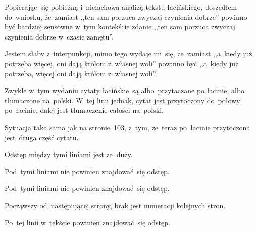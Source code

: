 \documentclass[a4paper,11pt]{article}
\begin{document}
\vspace{\spaceFour}


\start {} Popierając~się pobieżną i~niefachową analizą
tekstu łacińskiego, doszedłem do~wniosku, że~zamiast ,,ten sam porzuca
zwyczaj czynienia dobrze'' powinno być bardziej sensowne w~tym
kontekście zdanie ,,ten sam porzuca zwyczaj czynienia dobrze w~czasie
zamętu''.

\vspace{\spaceFour}


\start {} Jestem słaby z~interpunkcji, mimo tego wydaje
mi~się, że~zamiast ,,a~kiedy już potrzeba więcej, oni dają królom
z~własnej woli'' powinno być ,,a~kiedy już potrzeba, więcej oni dają
królom z~własnej woli''.

\vspace{\spaceFour}


\start {} Zwykle w~tym wydaniu cytaty łacińskie~są
albo~przytaczane po łacinie, albo tłumaczone na~polski. W~tej linii
jednak, cytat jest przytoczony do~połowy po~łacinie, dalej jest
tłumaczenie całości na~polski.

\vspace{\spaceFour}


\start {} Sytuacja taka sama jak na stronie~103, z~tym,
że~teraz po~łacinie przytoczona jest~druga część cytatu.

\vspace{\spaceFour}


\start {} Odstęp między tymi
liniami jest za~duży.

\vspace{\spaceFour}


\start {} Pod~tymi liniami nie powinien
znajdować~się odstęp.

\vspace{\spaceFour}


\start {} Pod~tymi liniami nie powinien
znajdować~się odstęp.

\vspace{\spaceFour}


\start {} Począwszy od~następującej strony, brak jest numeracji
kolejnych stron.

\vspace{\spaceFour}


\start {} Po~tej linii w~tekście powinien znajdować~się
odstęp.

\vspace{\spaceFour}
\end{document}
